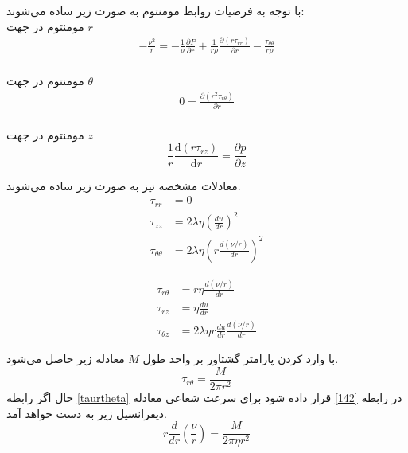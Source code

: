 با توجه به فرضیات روابط مومنتوم به صورت زیر ساده می‌شوند:
\\
مومنتوم در جهت $r$
\begin{equation}
	\label{rmom}
	\begin{split}
		- \frac{\nu^2}{r}
		= -\frac{1}{\rho} \frac{\partial P}{\partial r} + \frac{1}{r\rho}\frac{\partial\left(r\tau_{rr}\right)}{\partial r} - \frac{\tau_{\theta\theta}}{r\rho} 
	\end{split}
\end{equation}
\\
مومنتوم در جهت $\theta$
\begin{equation}
	\label{tetmom}
	\begin{split}
		0
		= \frac{\partial\left(r^2 \tau_{r\theta}\right)}{\partial r}
	\end{split}
\end{equation}
\\
مومنتوم در جهت $z$
\begin{equation}
	\label{zmom}
	\frac{1}{r} \frac{\mathrm{d}\left(r \tau_{r z}\right)}{\mathrm{d} r}=\frac{\partial p}{\partial z}
\end{equation}
\begin{multicols}{2}
معادلات مشخصه نیز به صورت زیر ساده می‌شوند.
\begin{eqnarray}
\tau_{rr} &= 0 \label{112}\\
\tau_{zz} &= 2\lambda\eta(\frac{du}{dr})^2\\
\tau_{\theta \theta} &= 2\lambda\eta\left(r\frac{d\left(\nu/r\right)}{dr}\right)^2
\end{eqnarray}

\begin{eqnarray}
	\tau_{r \theta} &= r\eta \frac{d\left(\nu /r\right)}{dr}\label{142}\\
	\tau_{rz} &= \eta \frac{du}{dr} \label{15-2}\\
	\tau_{\theta z} &= 2\lambda\eta r \frac{du}{dr}\frac{d\left(\nu /r\right)}{dr}
\end{eqnarray}
\end{multicols}
با وارد کردن پارامتر گشتاور بر واحد طول $M$ معادله زیر حاصل می‌شود.
\begin{equation}
\label{taurtheta}
\tau_{r \theta} = \frac{M}{2\pi r^2}
\end{equation}
حال اگر رابطه
\ref{taurtheta}
در رابطه 
\ref{142}
قرار داده شود برای سرعت شعاعی معادله دیفرانسیل زیر به دست خواهد‌ آمد.
\begin{equation}
	\label{15}
	r\frac{d}{dr}\left(\frac{\nu}{r}\right) = \frac{M}{2\pi\eta r^2}
\end{equation}
